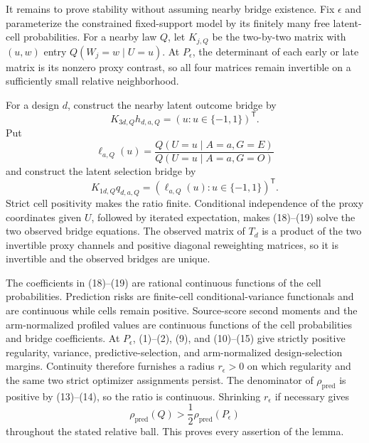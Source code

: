 It remains to prove stability without assuming nearby bridge existence. Fix \(\epsilon\) and parameterize the constrained fixed-support model by its finitely many free latent-cell probabilities. For a nearby law \(Q\), let \(K_{j,Q}\) be the two-by-two matrix with \((u,w)\) entry \(Q(W_j=w\mid U=u)\). At \(P_\epsilon\), the determinant of each early or late matrix is its nonzero proxy contrast, so all four matrices remain invertible on a sufficiently small relative neighborhood.

For a design \(d\), construct the nearby latent outcome bridge by
\[
 K_{3d,Q}h_{d,a,Q}=(u:u\in\{-1,1\})^{\mathsf T}.           \tag{18}
\]
Put
\[
 \ell_{a,Q}(u)=
 \frac{Q(U=u\mid A=a,G=E)}{Q(U=u\mid A=a,G=O)}
\]
and construct the latent selection bridge by
\[
 K_{1d,Q}q_{d,a,Q}=(\ell_{a,Q}(u):u\in\{-1,1\})^{\mathsf T}.
                                                                    \tag{19}
\]
Strict cell positivity makes the ratio finite. Conditional independence of the proxy coordinates given \(U\), followed by iterated expectation, makes (18)--(19) solve the two observed bridge equations. The observed matrix of \(T_d\) is a product of the two invertible proxy channels and positive diagonal reweighting matrices, so it is invertible and the observed bridges are unique.

The coefficients in (18)--(19) are rational continuous functions of the cell probabilities. Prediction risks are finite-cell conditional-variance functionals and are continuous while cells remain positive. Source-score second moments and the arm-normalized profiled values are continuous functions of the cell probabilities and bridge coefficients. At \(P_\epsilon\), (1)--(2), (9), and (10)--(15) give strictly positive regularity, variance, predictive-selection, and arm-normalized design-selection margins. Continuity therefore furnishes a radius \(r_\epsilon>0\) on which regularity and the same two strict optimizer assignments persist. The denominator of \(\rho_{\mathrm{pred}}\) is positive by (13)--(14), so the ratio is continuous. Shrinking \(r_\epsilon\) if necessary gives
\[
 \rho_{\mathrm{pred}}(Q)>\frac12\rho_{\mathrm{pred}}(P_\epsilon)
\]
throughout the stated relative ball. This proves every assertion of the lemma.